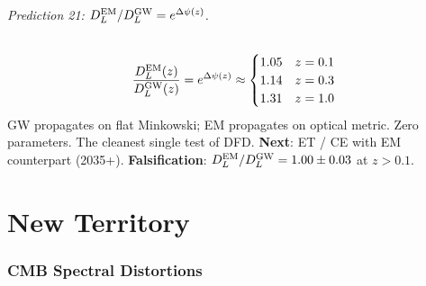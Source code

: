 \documentclass[11pt,a4paper]{article}
\newcommand{\Dpsi}{\Delta\psi}
\begin{document}
\paragraph{Prediction 21: $D_L^{\rm EM}/D_L^{\rm GW} = e^{\Dpsi(z)}$.}
\begin{equation}
\frac{D_L^{\rm EM}(z)}{D_L^{\rm GW}(z)} = e^{\Dpsi(z)}
\approx \begin{cases}
1.05 & z = 0.1 \\
1.14 & z = 0.3 \\
1.31 & z = 1.0
\end{cases}
\end{equation}
GW propagates on flat Minkowski; EM propagates on optical metric.
Zero parameters.  The cleanest single test of DFD.
\textbf{Next}: ET / CE with EM counterpart (2035+).
\textbf{Falsification}: $D_L^{\rm EM}/D_L^{\rm GW} = 1.00 \pm 0.03$
at $z > 0.1$.


\part{New Territory}
\label{sec:new}


\section{CMB Spectral Distortions}
\label{sec:spectral}
\end{document}
